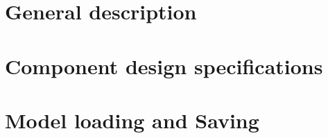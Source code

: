 \documentclass[a4paper,twoside,openright,makeidx,12pt]{book}
\begin{document}
\pagestyle{empty}
\renewcommand{\arraystretch}{1.8}



\tableofcontents


\pagestyle{fancy}
\clearpage

\newpage
{}
\chapter{General description}
\label{Sec:DDD-GeneralDescription}


%


%


\newpage
\chapter{Component design specifications}
\label{Sec:DDD-ComponentDesignSpecifications}



\newpage
\chapter{Model loading and Saving}


\end{document}
